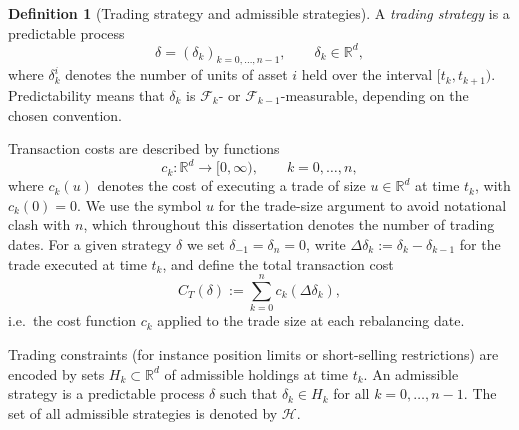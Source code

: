 \documentclass[12pt,a4paper]{article}
\theoremstyle{definition}
\newtheorem{definition}{Definition}[section]
\theoremstyle{plain}
\theoremstyle{remark}
\theoremstyle{plain}
\begin{document}
\begin{definition}[Trading strategy and admissible strategies]
\label{def:trading_strategy}
A \emph{trading strategy} is a predictable process
\[
    \delta = (\delta_k)_{k=0,\dots,n-1}, \qquad \delta_k \in \mathbb R^d,
\]
where $\delta^i_k$ denotes the number of units of asset $i$ held over the interval $[t_k,t_{k+1})$. 
Predictability means that $\delta_k$ is $\mathcal F_{k}$- or $\mathcal F_{k-1}$-measurable, depending on the chosen convention.

Transaction costs are described by functions
\[
    c_k : \mathbb R^d \to [0,\infty), \qquad k=0,\dots,n,
\]
where $c_k(u)$ denotes the cost of executing a trade of size $u \in \mathbb{R}^d$ at time $t_k$, with $c_k(0)=0$. We use the symbol $u$ for the trade-size argument to avoid notational clash with $n$, which throughout this dissertation denotes the number of trading dates.
For a given strategy $\delta$ we set $\delta_{-1}=\delta_n=0$, write $\Delta \delta_k := \delta_k - \delta_{k-1}$ for the trade executed at time $t_k$, and define the total transaction cost
\[
    C_T(\delta) := \sum_{k=0}^{n} c_k(\Delta \delta_k),
\]
i.e.\ the cost function $c_k$ applied to the trade size at each rebalancing date.

Trading constraints (for instance position limits or short-selling restrictions) are encoded by sets $H_k\subset\mathbb R^d$ of admissible holdings at time $t_k$. 
An admissible strategy is a predictable process $\delta$ such that $\delta_k\in H_k$ for all $k=0,\dots,n-1$. 
The set of all admissible strategies is denoted by $\mathcal H$.
\end{definition}
\end{document}
